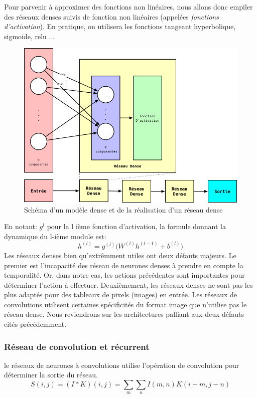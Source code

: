 Pour parvenir à approximer des fonctions non linéaires, nous allons donc empiler des réseaux denses suivis de fonction non linéaires (appelées \emph{fonctions d'activation}). En pratique, on utilisera les fonctions tangeant hyperbolique, sigmoide, relu ...

\begin{figure}[ht]
\begin{center}
    \includegraphics[scale=.3]{./assets/DeepLearning/Dense}
    \caption{Schéma d'un modèle dense et de la réalisation d'un réseau dense}
\end{center}
\end{figure}
En notant: $g^l$ pour la l ième fonction d'activation, la formule donnant la dynamique du l-ième module est: $$h^{(l)} = g^{(l)}\big(W^{(l)}h^{(l-1)} + b^{(l)} \big)$$
Les réseaux denses bien qu'extrêmment utiles ont deux défauts majeurs. Le premier est l'incapacité des réseau de neurones denses à prendre en compte la temporalité. Or, dans notre cas, les actions précédentes sont importantes pour déterminer l'action à effectuer. Deuxièmement, les réseaux denses ne sont pas les plus adaptés pour des tableaux de pixels (images) en entrée. Les réseaux de convolutions utilisent certaines spécificités du format image que n'utilise pas le réseau dense. Nous reviendrons sur les architectures palliant aux deux défauts cités précédemment. 

\subsubsection{Réseau de convolution et récurrent}
le réseaux de neurones à convolutions utilise l'opération de convolution pour déterminer la sortie du réseau. 
$$S(i,j) = (I * K) (i, j) = \underset{m}{\sum} \underset{n}{\sum} I(m,n) K(i-m, j-n)$$

